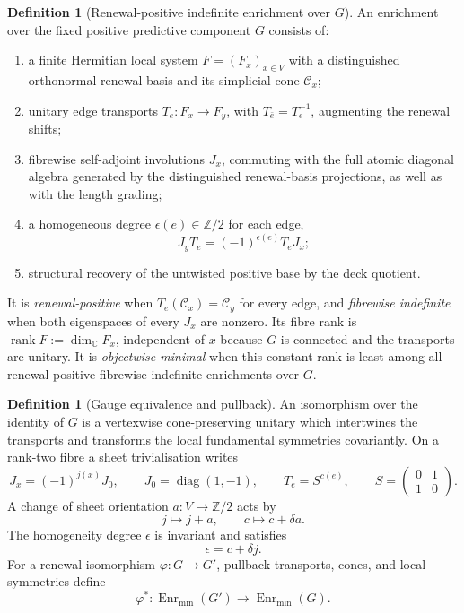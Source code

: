 \documentclass[11pt]{article}
\theoremstyle{definition}
\newtheorem{definition}[theorem]{Definition}
\theoremstyle{remark}
\newcommand{\Z}{\mathbb{Z}}
\newcommand{\C}{\mathbb{C}}
\newcommand{\rank}{\operatorname{rank}}
\newcommand{\diag}{\operatorname{diag}}
\begin{document}
\begin{definition}[Renewal-positive indefinite enrichment over \(G\)]
\label{def:fixed-enrichment}
An enrichment over the fixed positive predictive component \(G\) consists of:
\begin{enumerate}[label=\textup{(\roman*)},leftmargin=2.3em]
\item a finite Hermitian local system \(F=(F_x)_{x\in V}\) with a distinguished
      orthonormal renewal basis and its simplicial cone \(\mathcal C_x\);
\item unitary edge transports \(T_e:F_x\to F_y\), with
      \(T_{\bar e}=T_e^{-1}\), augmenting the renewal shifts;
\item fibrewise self-adjoint involutions \(J_x\), commuting with the full atomic
      diagonal algebra generated by the distinguished renewal-basis projections,
      as well as with the length grading;
\item a homogeneous degree \(\epsilon(e)\in\Z/2\) for each edge,
      \[
        J_yT_e=(-1)^{\epsilon(e)}T_eJ_x;
      \]
\item structural recovery of the untwisted positive base by the deck quotient.
\end{enumerate}
It is \emph{renewal-positive} when
\(T_e(\mathcal C_x)=\mathcal C_y\) for every edge, and
\emph{fibrewise indefinite} when both eigenspaces of every \(J_x\) are nonzero.
Its fibre rank is \(\rank F:=\dim_{\C}F_x\), independent of \(x\) because \(G\)
is connected and the transports are unitary.  It is \emph{objectwise minimal}
when this constant rank is least among all renewal-positive
fibrewise-indefinite enrichments over \(G\).
\end{definition}

\begin{definition}[Gauge equivalence and pullback]
\label{def:fixed-gauge}
An isomorphism over the identity of \(G\) is a vertexwise cone-preserving unitary
which intertwines the transports and transforms the local fundamental
symmetries covariantly.  On a rank-two fibre a sheet trivialisation writes
\[
  J_x=(-1)^{j(x)}J_0,\qquad
  J_0=\diag(1,-1),\qquad
  T_e=S^{c(e)},\qquad
  S=\begin{pmatrix}0&1\\1&0\end{pmatrix}.
\]
A change of sheet orientation \(a:V\to\Z/2\) acts by
\[
  j\longmapsto j+a,\qquad c\longmapsto c+\delta a.
\]
The homogeneity degree \(\epsilon\) is invariant and satisfies
\[
  \epsilon=c+\delta j.
\]
For a renewal isomorphism \(\varphi:G\to G'\), pullback transports, cones, and
local symmetries define
\[
  \varphi^*:\operatorname{Enr}_{\min}(G')
  \longrightarrow\operatorname{Enr}_{\min}(G).
\]
\end{definition}
\end{document}

